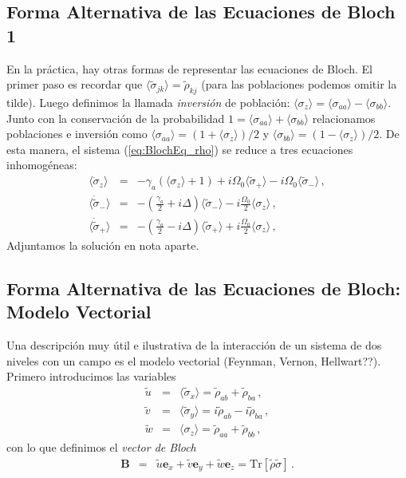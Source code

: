 \documentclass[twocolumn,aps,eqsecnum]{revtex4}
\newcommand{\mbe}{\mathbf{e}}
\newcommand{\mbB}{\mathbf{B}}
\newcommand{\Tr}{\mathrm{Tr}}
\providecommand{\vxp}[1]{\langle #1 \rangle}
\begin{document}
\subsection{Forma Alternativa de las Ecuaciones de Bloch 1}  
En la pr\'actica, hay otras formas de representar las ecuaciones de Bloch. 
El primer paso es recordar que $\vxp{\tilde{\sigma}_{jk}} = \tilde{\rho}_{kj}$ 
(para las poblaciones podemos omitir la tilde). Luego definimos la llamada 
\textit{inversi\'on} de poblaci\'on: 
$\vxp{\sigma_z} = \vxp{\sigma_{aa}} -\vxp{\sigma_{bb}}$. Junto con la 
conservaci\'on de la probabilidad $1 = \vxp{\sigma_{aa}} +\vxp{\sigma_{bb}}$ 
relacionamos poblaciones e inversi\'on como 
$\vxp{\sigma_{aa}} = (1+ \vxp{\sigma_z})/2$ y 
$\vxp{\sigma_{bb}} = (1- \vxp{\sigma_z})/2$. De esta manera, el sistema 
(\ref{eq:BlochEq_rho}) se reduce a tres ecuaciones inhomog\'eneas: 
%
\begin{eqnarray} 	\label{eq:BlochEq_+-z}
\vxp{\dot{\sigma}_z} &=& - \gamma_a ( \vxp{\sigma_z} +1)  
	+ i \Omega_0 \vxp{\tilde{\sigma}_+} 
	- i \Omega_0 \vxp{\tilde{\sigma}_-}	\,, \nonumber \\ 
\vxp{\dot{\tilde{\sigma}}_-}
	&=& - \left( \frac{\gamma_a}{2} +i\Delta \right) \vxp{\tilde{\sigma}_-} 
	-i\frac{\Omega_0}{2} \vxp{\sigma_z} 	\,, \nonumber \\ 
\vxp{\dot{\tilde{\sigma}}_+}
	&=& - \left( \frac{\gamma_a}{2} -i\Delta \right) 
	\vxp{\tilde{\sigma}_+} +i\frac{\Omega_0}{2} \vxp{\sigma_z} 	\,, 
\end{eqnarray}
Adjuntamos la soluci\'on en nota aparte.  

\subsection{Forma Alternativa de las Ecuaciones de Bloch: 
Modelo Vectorial} 
Una descripci\'on muy \'util e ilustrativa de la interacci\'on de un sistema 
de dos niveles con un campo es el modelo vectorial (Feynman, Vernon, 
Hellwart??). Primero introducimos las variables 
%
\begin{subequations}
\begin{eqnarray}
\tilde{u} &=& \vxp{\tilde{\sigma}_x} = \tilde{\rho}_{ab} + \tilde{\rho}_{ba} \,, \\ 
\tilde{v} &=& \vxp{\tilde{\sigma}_y} = i \tilde{\rho}_{ab} - i \tilde{\rho}_{ba} \,, \\ 
\tilde{w} &=& \vxp{\sigma_z} = \tilde{\rho}_{aa} + \tilde{\rho}_{bb} \,, 
\end{eqnarray}
\end{subequations}
con lo que definimos el \textit{vector de Bloch} 
%
\begin{eqnarray}
\mbB &=& \tilde{u} \mbe_x + \tilde{v} \mbe_y +  \tilde{w} \mbe_z 
	= \Tr [ \tilde{\rho} \tilde{\sigma} ] \,.
\end{eqnarray}
\end{document}

